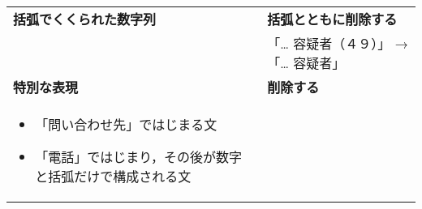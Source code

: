 \begin{tabular}{|p{6.3cm}|p{6.5cm}|}
{\bf 括弧でくくられた数字列} & {\bf 括弧とともに削除する}\\
& 「… 容疑者（４９）」  → 「… 容疑者」\\ \hline
{\bf 特別な表現} & {\bf 削除する}\\
\vspace{-3mm}
\begin{itemize}
\item 「問い合わせ先」ではじまる文
\item 「電話」ではじまり，その後が数字と括弧だけで構成される文
\end{itemize}\vspace{-5mm} & \\ \hline
\end{tabular}

\clearpage




